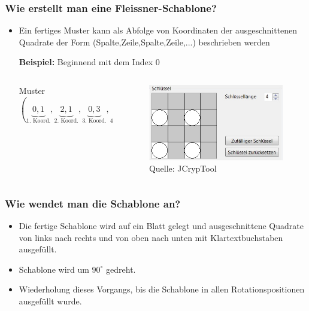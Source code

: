 \documentclass{beamer}
\begin{document}
\begin{frame}
\frametitle{Wie erstellt man eine Fleissner-Schablone?} 
\begin{itemize}
\item Ein fertiges Muster kann als Abfolge von Koordinaten der ausgeschnittenen Quadrate der Form (Spalte,Zeile,Spalte,Zeile,...) beschrieben werden%
\vspace{0.3cm}

\textbf{Beispiel:} Beginnend mit dem Index $0$\\
\hspace{1cm}
\begin{columns}
\begin{column}{4cm}
{\small
Muster $(\underbrace{0,1}_{\text{1. Koord.}},\underbrace{2,1}_{\text{2. Koord.}},\underbrace{0,3}_{\text{3. Koord.}},\underbrace{2,3}_{\text{4. Koord.}})$ }
\vspace{2cm}
\end{column}

\begin{column}{4.5cm}
\begin{figure}
\includegraphics[scale=0.5]{Schablone4mal4.jpg}
\caption{\footnotesize Quelle: JCrypTool}
\end{figure}
\vspace{0.5cm}
\end{column}
\end{columns}
\end{itemize}
\end{frame}

\begin{frame}
\frametitle{Wie wendet man die Schablone an?}
\begin{itemize}
\item Die fertige Schablone wird auf ein Blatt gelegt und ausgeschnittene Quadrate von links nach rechts und von oben nach unten mit Klartextbuchstaben ausgefüllt.%
\item Schablone wird um $90^\circ$ gedreht.%
\item Wiederholung dieses Vorgangs, bis die Schablone in allen Rotationspositionen ausgefüllt wurde.
\end{itemize}
\end{frame}
\end{document}
